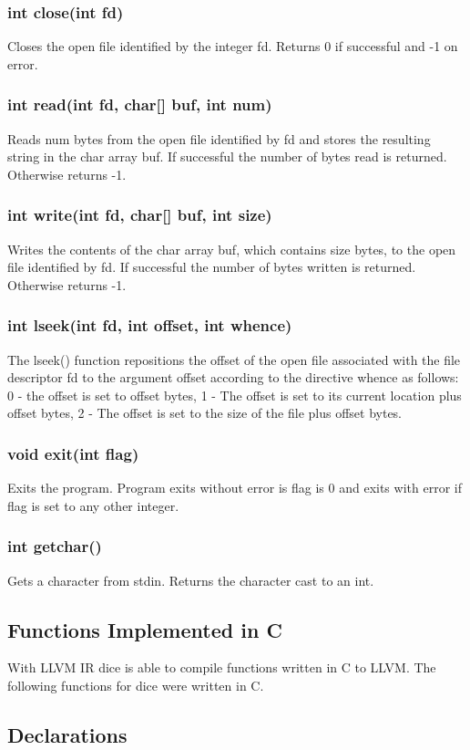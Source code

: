 \begin{homeworkProblem}
	\subsubsection{int close(int fd)}
	Closes the open file identified by the integer fd. Returns 0 if successful and -1 on error.
	\subsubsection{int read(int fd, char[] buf, int num)}
	Reads num bytes from the open file identified by fd and stores the resulting string in the char array buf. If successful the number of bytes read is returned. Otherwise returns -1.
	\subsubsection{int write(int fd, char[] buf, int size)}
	Writes the contents of the char array buf, which contains size bytes, to the open file identified by fd. If successful the number of bytes written is returned. Otherwise returns -1.
	\subsubsection{int lseek(int fd, int offset, int whence)}
	The lseek() function repositions the offset of the open file associated with the file descriptor fd to the argument offset according to the directive whence as follows: 0 - the offset is set to offset bytes, 1 - The offset is set to its current location plus offset bytes, 2 - The offset is set to the size of the file plus offset bytes.
	\subsubsection{void exit(int flag)}
	Exits the program. Program exits without error is flag is 0 and exits with error if flag is set to any other integer.
	\subsubsection{int getchar()}
	Gets a character from stdin. Returns the character cast to an int.
	\subsection{Functions Implemented in C}
	With LLVM IR dice is able to compile functions written in C to LLVM. The following functions for dice were written in C.
	
	\subsection{Declarations}

\end{homeworkProblem}
